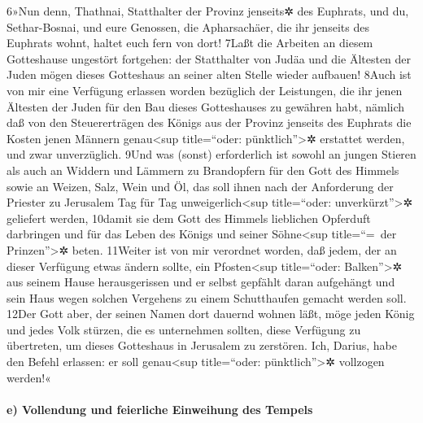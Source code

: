 6»Nun denn, Thathnai, Statthalter der Provinz jenseits✲ des Euphrats,
und du, Sethar-Bosnai, und eure Genossen, die Apharsachäer, die ihr
jenseits des Euphrats wohnt, haltet euch fern von dort! 7Laßt die
Arbeiten an diesem Gotteshause ungestört fortgehen: der Statthalter von
Judäa und die Ältesten der Juden mögen dieses Gotteshaus an seiner alten
Stelle wieder aufbauen! 8Auch ist von mir eine Verfügung erlassen worden
bezüglich der Leistungen, die ihr jenen Ältesten der Juden für den Bau
dieses Gotteshauses zu gewähren habt, nämlich daß von den Steuererträgen
des Königs aus der Provinz jenseits des Euphrats die Kosten jenen
Männern genau\textless sup title=``oder: pünktlich''\textgreater✲
erstattet werden, und zwar unverzüglich. 9Und was (sonst) erforderlich
ist sowohl an jungen Stieren als auch an Widdern und Lämmern zu
Brandopfern für den Gott des Himmels sowie an Weizen, Salz, Wein und Öl,
das soll ihnen nach der Anforderung der Priester zu Jerusalem Tag für
Tag unweigerlich\textless sup title=``oder: unverkürzt''\textgreater✲
geliefert werden, 10damit sie dem Gott des Himmels lieblichen Opferduft
darbringen und für das Leben des Königs und seiner Söhne\textless sup
title=``=~der Prinzen''\textgreater✲ beten. 11Weiter ist von mir
verordnet worden, daß jedem, der an dieser Verfügung etwas ändern
sollte, ein Pfosten\textless sup title=``oder: Balken''\textgreater✲ aus
seinem Hause herausgerissen und er selbst gepfählt daran aufgehängt und
sein Haus wegen solchen Vergehens zu einem Schutthaufen gemacht werden
soll. 12Der Gott aber, der seinen Namen dort dauernd wohnen läßt, möge
jeden König und jedes Volk stürzen, die es unternehmen sollten, diese
Verfügung zu übertreten, um dieses Gotteshaus in Jerusalem zu zerstören.
Ich, Darius, habe den Befehl erlassen: er soll genau\textless sup
title=``oder: pünktlich''\textgreater✲ vollzogen werden!«

\hypertarget{e-vollendung-und-feierliche-einweihung-des-tempels}{%
\paragraph{e) Vollendung und feierliche Einweihung des
Tempels}\label{e-vollendung-und-feierliche-einweihung-des-tempels}}

